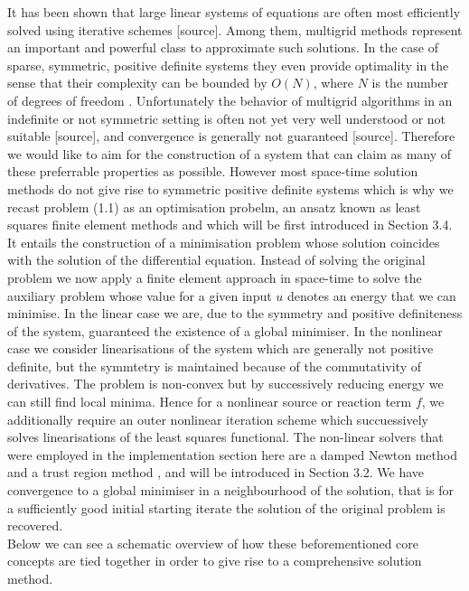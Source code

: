 \documentclass[../draft_1.tex]{subfiles}
\begin{document}
It has been shown that large linear systems of equations are often most efficiently solved using iterative schemes [source]. Among them, multigrid methods represent an important and powerful class to approximate such solutions. In the case of sparse, symmetric, positive definite systems they even provide optimality in the sense that their complexity can be bounded by $O(N)$, where $N$ is the number of degrees of freedom \cite{brandt1977multi}. Unfortunately the behavior of multigrid algorithms in an indefinite or not symmetric setting is often not yet very well understood or not suitable [source], and convergence is generally not guaranteed [source]. Therefore we would like to aim for the construction of a system that can claim as many of these preferrable properties as possible. However most space-time solution methods do not give rise to symmetric positive definite systems \cite{gander201550} which is why we recast problem (1.1) as an optimisation probelm, an ansatz known as least squares finite element methods \cite{bochev2009least} and which will be first introduced in Section 3.4. It entails the construction of a minimisation problem whose solution coincides with the solution of the differential equation. Instead of solving the original problem we now apply a finite element approach in space-time to solve the auxiliary problem whose value for a given input $u$ denotes an energy that we can minimise. In the linear case we are, due to the symmetry and positive definiteness of the system, guaranteed the existence of a global minimiser. In the nonlinear case we consider linearisations of the system which are generally not positive definite, but the symmtetry is maintained because of the commutativity of derivatives. The problem is non-convex but by successively reducing energy we can still find local minima. Hence for a nonlinear source or reaction term $f$, we additionally require an outer nonlinear iteration scheme which succuessively solves linearisations of the least squares functional. The non-linear solvers that were employed in the implementation section here are a damped Newton method \cite{deuflhard2011newton} and a trust region method \cite{conn2000trust}, and will be introduced in Section 3.2. We have convergence to a global minimiser in a neighbourhood of the solution, that is for a sufficiently good initial starting iterate the solution of the original problem is recovered.
\smallskip
\\
Below we can see a schematic overview of how these beforementioned core concepts are tied together in order to give rise to a comprehensive solution method.
\end{document}
